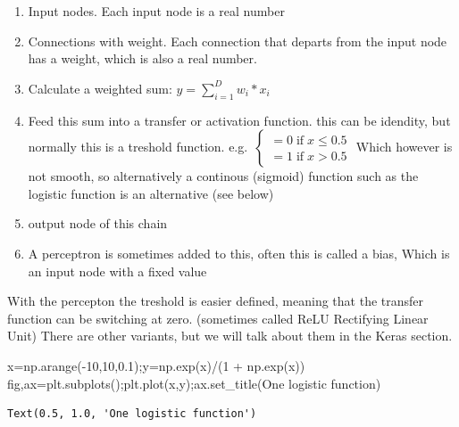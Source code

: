 \documentclass[
  letterpaper,
  DIV=11,
  numbers=noendperiod]{scrartcl}
\newenvironment{Shaded}{\begin{snugshade}}{\end{snugshade}}
\newcommand{\DecValTok}[1]{\textcolor[rgb]{0.68,0.00,0.00}{#1}}
\newcommand{\FloatTok}[1]{\textcolor[rgb]{0.68,0.00,0.00}{#1}}
\newcommand{\NormalTok}[1]{\textcolor[rgb]{0.00,0.23,0.31}{#1}}
\newcommand{\OperatorTok}[1]{\textcolor[rgb]{0.37,0.37,0.37}{#1}}
\newcommand{\StringTok}[1]{\textcolor[rgb]{0.13,0.47,0.30}{#1}}
\providecommand{\tightlist}{%
  \setlength{\itemsep}{0pt}\setlength{\parskip}{0pt}}\usepackage{longtable,booktabs,array}
\begin{document}
\begin{enumerate}
\def\labelenumi{\arabic{enumi}.}
\tightlist
\item
  Input nodes. Each input node is a real number
\item
  Connections with weight. Each connection that departs from the input
  node has a weight, which is also a real number.
\item
  Calculate a weighted sum: \(y = \sum_{i=1}^{D} w_i*x_i\)
\item
  Feed this sum into a transfer or activation function. this can be
  idendity, but normally this is a treshold function.
  e.g.~\(\left\{\begin{matrix}
  =0 \;\text{if}\; x\leq 0.5\\
  =1 \;\text{if}\; x>0.5
  \end{matrix}\right.\) Which however is not smooth, so alternatively a
  continous (sigmoid) function such as the logistic function is an
  alternative (see below)
\item
  output node of this chain
\item
  A perceptron is sometimes added to this, often this is called a bias,
  Which is an input node with a fixed value
\end{enumerate}

With the percepton the treshold is easier defined, meaning that the
transfer function can be switching at zero. (sometimes called ReLU
Rectifying Linear Unit) There are other variants, but we will talk about
them in the Keras section.

\begin{Shaded}
\begin{Highlighting}[]
\NormalTok{x}\OperatorTok{=}\NormalTok{np.arange(}\OperatorTok{{-}}\DecValTok{10}\NormalTok{,}\DecValTok{10}\NormalTok{,}\FloatTok{0.1}\NormalTok{)}\OperatorTok{;}\NormalTok{y}\OperatorTok{=}\NormalTok{np.exp(x)}\OperatorTok{/}\NormalTok{(}\DecValTok{1} \OperatorTok{+}\NormalTok{ np.exp(x))}
\NormalTok{fig,ax}\OperatorTok{=}\NormalTok{plt.subplots()}\OperatorTok{;}\NormalTok{plt.plot(x,y)}\OperatorTok{;}\NormalTok{ax.set\_title(}\StringTok{\textquotesingle{}One logistic function\textquotesingle{}}\NormalTok{)}
\end{Highlighting}
\end{Shaded}

\begin{verbatim}
Text(0.5, 1.0, 'One logistic function')
\end{verbatim}
\end{document}
